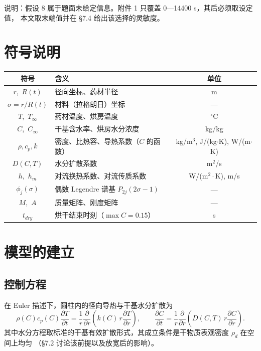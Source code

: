 \documentclass[12pt,a4paper]{ctexart}
\begin{document}
\noindent 说明：假设 8 属于题面未给定信息。附件 1 只覆盖 0—14400 s，其后必须取设定值，
本文取末端值并在 \S7.4 给出该选择的灵敏度。

\section{符号说明}

\begin{center}
\small
\begin{tabular}{@{}clc@{}}
\toprule
符号 & 含义 & 单位 \\
\midrule
$r$,\ $R(t)$ & 径向坐标、药材半径 & m \\
$\sigma=r/R(t)$ & 材料（拉格朗日）坐标 & --- \\
$T$,\ $T_\infty$ & 药材温度、烘房温度 & $^\circ$C \\
$C$,\ $C_\infty$ & 干基含水率、烘房水分浓度 & kg/kg \\
$\rho,c_p,k$ & 密度、比热容、导热系数（$C$ 的函数） & kg/m$^3$, J/(kg$\cdot$K), W/(m$\cdot$K) \\
$D(C,T)$ & 水分扩散系数 & m$^2$/s \\
$h$,\ $h_m$ & 对流换热系数、对流传质系数 & W/(m$^2\cdot$K), m/s \\
$\phi_j(\sigma)$ & 偶数 Legendre 谱基 $P_{2j}(2\sigma-1)$ & --- \\
$M$,\ $A$ & 质量矩阵、刚度矩阵 & --- \\
$t_{dry}$ & 烘干结束时刻（$\max C=0.15$） & s \\
\bottomrule
\end{tabular}
\end{center}

\section{模型的建立}

\subsection{控制方程}
在 Euler 描述下，圆柱内的径向导热与干基水分扩散为
\begin{equation}
\rho(C)c_p(C)\frac{\partial T}{\partial t}
=\frac{1}{r}\frac{\partial}{\partial r}\!\left(k(C)\,r\frac{\partial T}{\partial r}\right),
\qquad
\frac{\partial C}{\partial t}
=\frac{1}{r}\frac{\partial}{\partial r}\!\left(D(C,T)\,r\frac{\partial C}{\partial r}\right).
\label{eq:gov}
\end{equation}
其中水分方程取标准的干基有效扩散形式，其成立条件是干物质表观密度 $\rho_d$ 在空间上均匀
（\S7.2 讨论该前提以及放宽后的影响）。
\end{document}
